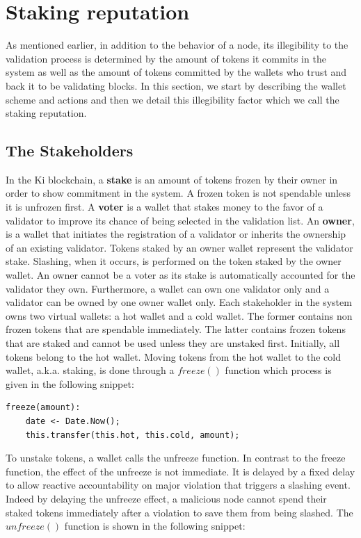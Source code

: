 \documentclass[]{article}
\begin{document}
\section{Staking reputation}
As mentioned earlier, in addition to the behavior of a node, its illegibility to the validation process is determined by the amount of tokens it commits in the system as well as the amount of tokens committed by the wallets who trust and back it to be validating blocks. In this section, we start by describing the wallet scheme and actions and then we detail this illegibility factor which we call the staking reputation.  

\subsection{The Stakeholders}
In the Ki blockchain, a \textbf{stake} is an amount of tokens frozen by their owner in order to show commitment in the system. A frozen token is not spendable unless it is unfrozen first. A \textbf{voter} is a wallet that stakes money to the favor of a validator to improve its chance of being selected in the validation list. An \textbf{owner}, is a wallet that initiates the registration of a validator or inherits the ownership of an existing validator. Tokens staked by an owner wallet represent the validator stake. Slashing, when it occurs, is performed on the token staked by the owner wallet. An owner cannot be a voter as its stake is automatically accounted for the validator they own. Furthermore, a wallet can own one validator only and a validator can be owned by one owner wallet only. Each stakeholder in the system owns two virtual wallets: a hot wallet and a cold wallet. The former contains non frozen tokens that are spendable immediately. The latter contains frozen tokens that are staked and cannot be used unless they are unstaked first. Initially, all tokens belong to the hot wallet. Moving tokens from the hot wallet to the cold wallet, a.k.a. staking, is done through a $freeze()$ function which process is given in the following snippet:

\begin{lstlisting}[frame=single]
freeze(amount):
    date <- Date.Now();
    this.transfer(this.hot, this.cold, amount);
\end{lstlisting}

To unstake tokens, a wallet calls the unfreeze function. In contrast to the freeze function, the effect of the unfreeze is not immediate. It is delayed by a fixed delay to allow reactive accountability on major violation that triggers a slashing event. Indeed by delaying the unfreeze effect, a malicious node cannot spend their staked tokens immediately after a violation to save them from being slashed. The $unfreeze()$ function is shown in the following snippet:
\end{document}
